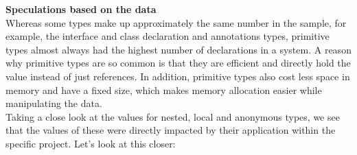 \documentclass{assignment}
\begin{document}
\begin{enumerate}
\textbf{Speculations based on the data}\\

	Whereas some types make up approximately the same number in the sample, for example, the interface and class declaration and annotations types, primitive types almost always had the highest number of declarations in a system. A reason why primitive types are so common is that they are efficient and directly hold the value instead of just references. In addition, primitive types also cost less space in memory and have a fixed size, which makes memory allocation easier while manipulating the data.\\

	Taking a close look at the values for nested, local and anonymous types, we see that the values of these were directly impacted by their application within the specific project. 
Let’s look at this closer:
\begin{enumerate}


\end{enumerate}
\end{enumerate}
\end{document}
